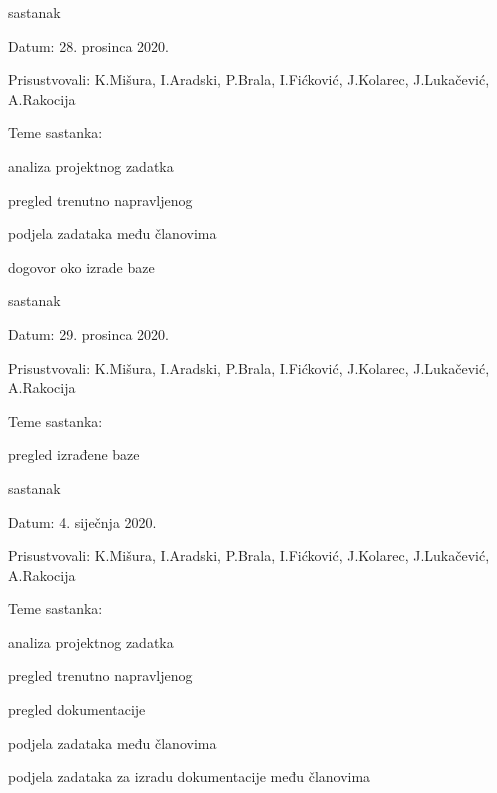 \begin{packed_enum}
			\item  sastanak
			\item[] \begin{packed_item}
				\item Datum: 28. prosinca 2020.
				\item Prisustvovali:  K.Mišura, I.Aradski, P.Brala, I.Fićković, J.Kolarec, J.Lukačević, A.Rakocija
				\item Teme sastanka:
				\begin{packed_item}
					\item  analiza projektnog zadatka 
					\item  pregled trenutno napravljenog
					\item  podjela zadataka među članovima
					\item  dogovor oko izrade baze
				\end{packed_item}
			\end{packed_item}
			
			\item  sastanak
			\item[] \begin{packed_item}
				\item Datum: 29. prosinca 2020.
				\item Prisustvovali:  K.Mišura, I.Aradski, P.Brala, I.Fićković, J.Kolarec, J.Lukačević, A.Rakocija
				\item Teme sastanka:
				\begin{packed_item}
					\item  pregled izrađene baze
				\end{packed_item}
			\end{packed_item}
			
			\item  sastanak
			\item[] \begin{packed_item}
				\item Datum: 4. siječnja 2020.
				\item Prisustvovali:  K.Mišura, I.Aradski, P.Brala, I.Fićković, J.Kolarec, J.Lukačević, A.Rakocija
				\item Teme sastanka:
				\begin{packed_item}
					\item  analiza projektnog zadatka 
					\item  pregled trenutno napravljenog
					\item  pregled dokumentacije
					\item  podjela zadataka među članovima
					\item  podjela zadataka za izradu dokumentacije među članovima 
				\end{packed_item}
			\end{packed_item}
			

\end{packed_enum}
